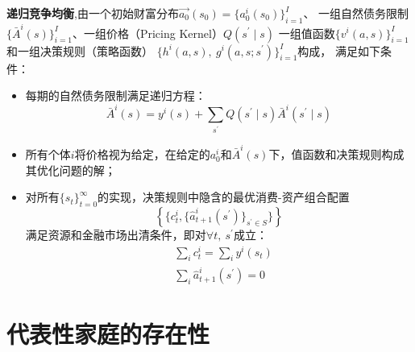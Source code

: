 \begin{definition}
    \textbf{递归竞争均衡},由一个初始财富分布$\vec{a_0}\left(s_0\right)=\{a_0^i\left(s_0\right)\}_{i=1}^I$、
    一组自然债务限制$\{\bar{A}^i\left(s\right)\}_{i=1}^I$、一组价格（Pricing Kernel）$Q\left(s^{\prime}\mid s\right)$
    一组值函数$\{v^i\left(a,s\right)\}_{i=1}^I$和一组决策规则（策略函数）
    $\{h^i\left(a,s\right),~g^i\left(a,s;s^{\prime}\right)\}_{i=1}^I$构成，
    满足如下条件：
    \begin{itemize}
        \item 每期的自然债务限制满足递归方程：
            \begin{equation}
                \bar{A}^i(s)=
                    y^i(s)+\sum_{s^{\prime}} Q\left(s^{\prime} \mid s\right) \bar{A}^i\left(s^{\prime} \mid s\right)
            \end{equation}
        \item 所有个体$i$将价格视为给定，在给定的$a_0^i$和$\bar{A}^i\left(s\right)$下，值函数和决策规则构成其优化问题的解；
        \item 对所有$\{s_t\}_{t=0}^{\infty}$的实现，决策规则中隐含的最优消费-资产组合配置
            $$\left\{ \{ c_t^i,\{ \hat{a}_{t+1}^i\left(s^{\prime}\right) \}_{s^{\prime}\in S} \} \right\}$$
            满足资源和金融市场出清条件，即对$\forall t,~ s^{\prime}$成立：
            \begin{equation*}
                \begin{aligned}
                    &\sum_{i}c_t^i =\sum_{i}y^i\left(s_t\right) \\
                    &\sum_{i}\hat{a}_{t+1}^i\left(s^{\prime}\right)= 0
                \end{aligned}
            \end{equation*}
    \end{itemize}
\end{definition}


\section{代表性家庭的存在性}

